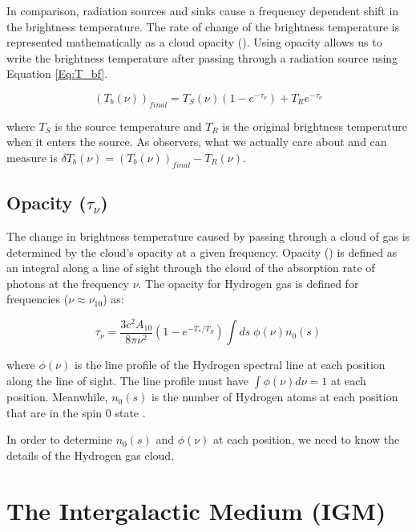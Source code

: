 In comparison, radiation sources and sinks cause a frequency dependent shift in the brightness temperature. The rate of change of the brightness temperature is represented mathematically as a cloud opacity (\tu). Using opacity allows us to write the brightness temperature after passing through a radiation source using Equation \ref{Eq:T_bf}. 

\begin{equation}\label{Eq:T_bf}
(T_b (\nu))_{final}= T_{S} (\nu) (1-e^{-\tau_\nu}) +T_{R} e^{-\tau_\nu}
\end{equation}

where $T_{S}$ is the source temperature and $T_{R}$ is the original brightness temperature when it enters the source. As observers, what we actually care about and can measure is $\delta T_b (\nu) = (T_b (\nu))_{final} - T_R  (\nu)$. 


\subsection{Opacity ($\tau_\nu$)}

The change in brightness temperature caused by passing through a cloud of gas is determined by the cloud's opacity at a given frequency. Opacity (\tu) is defined as an integral along a line of sight through the cloud of the absorption rate of photons at the frequency $\nu$. The opacity for Hydrogen gas is defined for frequencies ($\nu \approx \nu_{10}$) as: 

\begin{equation} \label{Eq:tau}
\tau_{\nu} = \frac{3 c^2 A_{10}}{8 \pi \nu^2 } (1-e^{-T_*/T_S}) \int ds \; \phi (\nu) n_0(s)
\end{equation}

where $\phi (\nu)$ is the line profile of the Hydrogen \cm spectral line at each position along the line of sight. The line profile must have $\int \phi(\nu) d \nu = 1$ at each position. Meanwhile, $n_0 (s)$ is the number of Hydrogen atoms at each position that are in the spin 0 state \cite{furlanetto_2006}. 

In order to determine $n_0 (s)$ and $\phi (\nu)$ at each position, we need to know the details of the Hydrogen gas cloud. 



\section{The Intergalactic Medium (IGM)}\label{Sec:IGM}

